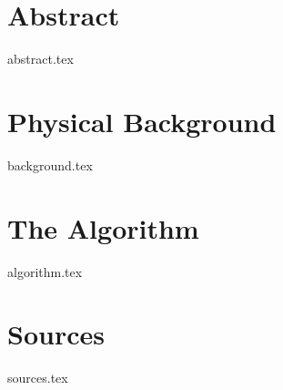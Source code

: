 \documentclass[a4paper,headsepline,11pt]{scrartcl}
\begin{document}
\clearpage

\section{Abstract}
{abstract.tex}
\clearpage

\tableofcontents
\clearpage

\section{Physical Background}
{background.tex}
\clearpage

\section{The Algorithm}
{algorithm.tex}
\clearpage


\section{Sources}
{sources.tex}
\clearpage
\end{document}
